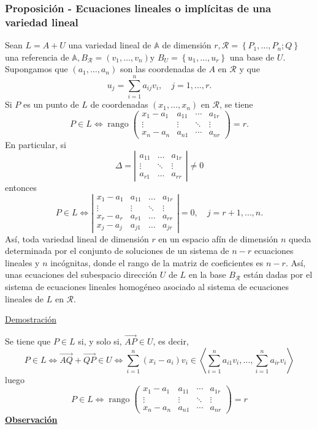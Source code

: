 \documentclass[12pt, a4paper, ones, notitlepage, openany,titlepage]{article}
\newcommand{\demostracion}{\noindent\underline{Demostración}}
\newcommand{\observacion}{\noindent\underline{\textbf{Observación}}}
\begin{document}
\subsubsection{Proposición - Ecuaciones lineales o implícitas de una variedad lineal}
Sean $L=A+U$ una variedad lineal de $\mathbb{A}$ de dimensión $r, \mathcal{R}=\left\{P_{1}, \ldots, P_{n} ; Q\right\}$ una referencia de $\mathbb{A}, B_{\mathcal{R}}=\left(v_{1}, \ldots, v_{n}\right) \mathrm{y}$ $B_{U}=\left\{u_{1}, \ldots, u_{r}\right\}$ una base de $U$. Supongamos que $\left(a_{1}, \ldots, a_{n}\right)$ son las coordenadas de $A$ en $\mathcal{R}$ y que
$$
u_{j}=\sum_{i=1}^{n} a_{i j} v_{i}, \quad j=1, \ldots, r .
$$
\noindent Si $P$ es un punto de $L$ de coordenadas $\left(x_{1}, \ldots, x_{n}\right)$ en $\mathcal{R}$, se tiene
$$
P \in L \Longleftrightarrow \operatorname{rango}\left(\begin{array}{cccc}
x_{1}-a_{1} & a_{11} & \cdots & a_{1 r} \\
\vdots & \vdots & \ddots & \vdots \\
x_{n}-a_{n} & a_{n 1} & \cdots & a_{n r}
\end{array}\right)=r .
$$
\noindent En particular, si
$$
\Delta=\left|\begin{array}{ccc}
a_{11} & \ldots & a_{1 r} \\
\vdots & \ddots & \vdots \\
a_{r 1} & \ldots & a_{r r}
\end{array}\right| \neq 0
$$
\noindent entonces
$$
P \in L \Longleftrightarrow\left|\begin{array}{rrrr}
x_{1}-a_{1} & a_{11} & \ldots & a_{1 r} \\
\vdots & \vdots & \ddots & \vdots \\
x_{r}-a_{r} & a_{r 1} & \ldots & a_{r r} \\
x_{j}-a_{j} & a_{j 1} & \ldots & a_{j r}
\end{array}\right|=0, \quad j=r+1, \ldots, n .
$$
\noindent Así, toda variedad lineal de dimensión $r$ en un espacio afín de dimensión $n$ queda determinada por el conjunto de soluciones de un sistema de $n-r$ ecuaciones lineales y $n$ incógnitas, donde el rango de la matriz de coeficientes es $n-r$. Así, unas ecuaciones del subespacio dirección $U$ de $L$ en la base $B_{\mathcal{R}}$ están dadas por el sistema de ecuaciones lineales homogéneo asociado al sistema de ecuaciones lineales de $L$ en $\mathcal{R}$.

\demostracion

\noindent Se tiene que $P \in L$ si, y solo si, $\overrightarrow{A P} \in U$, es decir,
$$
P \in L \Longleftrightarrow \overrightarrow{A Q}+\overrightarrow{Q P} \in U \Longleftrightarrow \sum_{i=1}^{n}\left(x_{i}-a_{i}\right) v_{i} \in\left\langle\sum_{i=1}^{n} a_{i 1} v_{i}, \ldots, \sum_{i=1}^{n} a_{i r} v_{i}\right\rangle
$$
\noindent luego
$$
P \in L \Longleftrightarrow \operatorname{rango}\left(\begin{array}{cccc}
x_{1}-a_{1} & a_{11} & \cdots & a_{1 r} \\
\vdots & \vdots & \ddots & \vdots \\
x_{n}-a_{n} & a_{n 1} & \cdots & a_{n r}
\end{array}\right)=r
$$
\observacion
\end{document}
